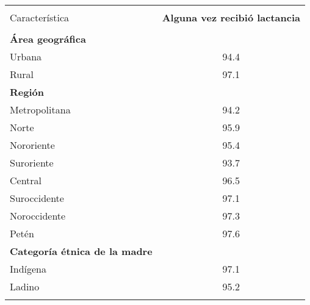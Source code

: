 \small
\begin{tabular}{p{3.5cm}c}\hline
	\rowcolor{color2!0!white}&\\[-4mm]
	{\Bold   Característica}  & \textbf{Alguna vez recibió lactancia}\\
	\hline
	\rowcolor{color1!40!white} &\\[-4mm]
\rowcolor{color1!40!white}\textbf{Área geográfica}	&		\\
\rowcolor{color1!10!white}Urbana	&	94.4	\\
Rural	&	97.1	\\
\rowcolor{color1!40!white}\textbf{Región}	&		\\
\rowcolor{color1!0!white}Metropolitana	&	94.2	\\
Norte	&	95.9	\\
Nororiente	&	95.4	\\
Suroriente	&	93.7	\\
Central	&	96.5	\\
Suroccidente	&	97.1	\\
Noroccidente	&	97.3	\\
Petén	&	97.6	\\
\rowcolor{color1!40!white}\textbf{Categoría étnica de la madre}	&		\\
\rowcolor{color1!10!white}Indígena	&	97.1	\\
Ladino	&	95.2	\\
	\hline
	
\rowcolor{color1!0!white}	&\\[0.05cm]
\end{tabular}
